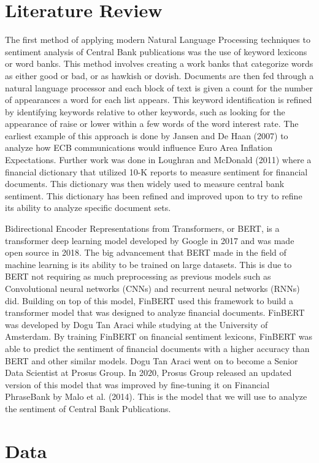 \documentclass[12pt, letterpaper]{article}
\begin{document}
\section{Literature Review}
The first method of applying modern Natural Language Processing techniques to sentiment analysis of Central Bank publications was the use of keyword lexicons or word banks. This method involves creating a work banks that categorize words as either good or bad, or as hawkish or dovish. Documents are then fed through a natural language processor and each block of text is given a count for the number of appearances a word for each list appears. This keyword identification is refined by identifying keywords relative to other keywords, such as looking for the appearance of raise or lower within a few words of the word interest rate. The earliest example of this approach is done by Jansen and De Haan (2007) to analyze how ECB communications would influence Euro Area Inflation Expectations. Further work was done in Loughran and McDonald (2011) where a financial dictionary that utilized 10-K reports to measure sentiment for financial documents. This dictionary was then widely used to measure central bank sentiment. This dictionary has been refined and improved upon to try to refine its ability to analyze specific document sets. 

Bidirectional Encoder Representations from Transformers, or BERT, is a transformer deep learning model developed by Google in 2017 and was made open source in 2018. The big advancement that BERT made in the field of machine learning is its ability to be trained on large datasets. This is due to BERT not requiring as much preprocessing as previous models such as Convolutional neural networks (CNNs) and recurrent neural networks (RNNs) did. Building on top of this model, FinBERT used this framework to build a transformer model that was designed to analyze financial documents. FinBERT was developed by Dogu Tan Araci while studying at the University of Amsterdam. By training FinBERT on financial sentiment lexicons, FinBERT was able to predict the sentiment of financial documents with a higher accuracy than BERT and other similar models. Dogu Tan Araci went on to become a Senior Data Scientist at Prosus Group. In 2020, Prosus Group released an updated version of this model that was improved by fine-tuning it on Financial PhraseBank by Malo et al. (2014). This is the model that we will use to analyze the sentiment of Central Bank Publications. 

\section{Data}
\end{document}
